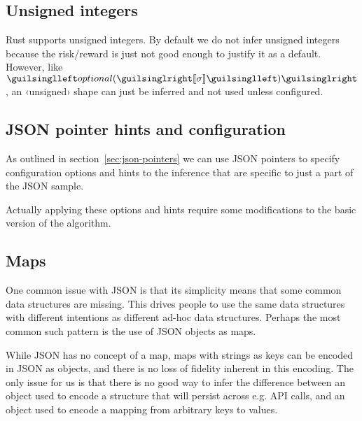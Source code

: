 \subsection{Unsigned integers}
\label{sec:unsigned}

Rust supports unsigned integers. By default we do not infer unsigned integers because the risk/reward is just not good enough to justify it as a default. However, like $‹optional(›\vect{\sigma}‹)›$, an ‹unsigned› shape can just be inferred and not used unless configured.


\subsection{JSON pointer hints and configuration}
\label{sec:ext-json-pointers}

As outlined in section~\ref{sec:json-pointers} we can use JSON pointers to specify configuration options and hints to the inference that are specific to just a part of the JSON sample.

Actually applying these options and hints require some modifications to the basic version of the algorithm.




\subsection{Maps}
\label{sec:ext-maps}

One common issue with JSON is that its simplicity means that some common data structures are missing. This drives people to use the same data structures with different intentions as different ad-hoc data structures. Perhaps the most common such pattern is the use of JSON objects as maps.


While JSON has no concept of a map, maps with strings as keys can be encoded in JSON as objects, and there is no loss of fidelity inherent in this encoding. The only issue for us is that there is no good way to infer the difference between an object used to encode a structure that will persist across e.g. API calls, and an object used to encode a mapping from arbitrary keys to values.


